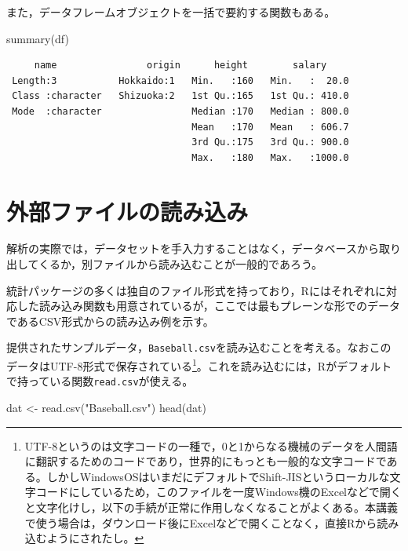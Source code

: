 \documentclass[
  a4paper,
]{ltjsbook}
\newenvironment{Shaded}{\begin{snugshade}}{\end{snugshade}}
\newcommand{\FunctionTok}[1]{\textcolor[rgb]{0.28,0.35,0.67}{#1}}
\newcommand{\NormalTok}[1]{\textcolor[rgb]{0.00,0.23,0.31}{#1}}
\newcommand{\OtherTok}[1]{\textcolor[rgb]{0.00,0.23,0.31}{#1}}
\newcommand{\StringTok}[1]{\textcolor[rgb]{0.13,0.47,0.30}{#1}}
\begin{document}
また，データフレームオブジェクトを一括で要約する関数もある。

\begin{Shaded}
\begin{Highlighting}[]
\FunctionTok{summary}\NormalTok{(df)}
\end{Highlighting}
\end{Shaded}

\begin{verbatim}
     name                origin      height        salary      
 Length:3           Hokkaido:1   Min.   :160   Min.   :  20.0  
 Class :character   Shizuoka:2   1st Qu.:165   1st Qu.: 410.0  
 Mode  :character                Median :170   Median : 800.0  
                                 Mean   :170   Mean   : 606.7  
                                 3rd Qu.:175   3rd Qu.: 900.0  
                                 Max.   :180   Max.   :1000.0  
\end{verbatim}

\section{外部ファイルの読み込み}\label{ux5916ux90e8ux30d5ux30a1ux30a4ux30ebux306eux8aadux307fux8fbcux307f}

解析の実際では，データセットを手入力することはなく，データベースから取り出してくるか，別ファイルから読み込むことが一般的であろう。

統計パッケージの多くは独自のファイル形式を持っており，Rにはそれぞれに対応した読み込み関数も用意されているが，ここでは最もプレーンな形でのデータであるCSV形式からの読み込み例を示す。

提供されたサンプルデータ，\texttt{Baseball.csv}を読み込むことを考える。なおこのデータはUTF-8形式で保存されている\footnote{UTF-8というのは文字コードの一種で，0と1からなる機械のデータを人間語に翻訳するためのコードであり，世界的にもっとも一般的な文字コードである。しかしWindowsOSはいまだにデフォルトでShift-JISというローカルな文字コードにしているため，このファイルを一度Windows機のExcelなどで開くと文字化けし，以下の手続が正常に作用しなくなることがよくある。本講義で使う場合は，ダウンロード後にExcelなどで開くことなく，直接Rから読み込むようにされたし。}。これを読み込むには，Rがデフォルトで持っている関数\texttt{read.csv}が使える。

\begin{Shaded}
\begin{Highlighting}[]
\NormalTok{dat }\OtherTok{\textless{}{-}} \FunctionTok{read.csv}\NormalTok{(}\StringTok{"Baseball.csv"}\NormalTok{)}
\FunctionTok{head}\NormalTok{(dat)}
\end{Highlighting}
\end{Shaded}
\end{document}
